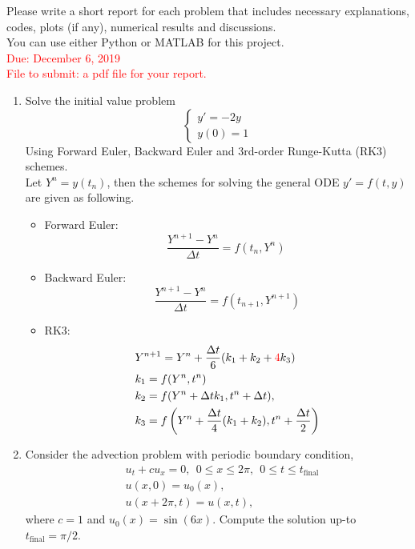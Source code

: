 \documentclass[11pt]{article}
\begin{document}

Please write a short report for each problem that includes necessary  explanations, codes, plots (if any),  numerical results and discussions.\\
You can use either Python or MATLAB for this project.\\
\textcolor{red}{Due: December 6, 2019\\
File to submit: a pdf file for your report.
}

\begin{enumerate}
\item  Solve the initial value problem 
$$
\begin{cases}
y'= -2 y\\
y(0)=1
\end{cases}
$$
Using Forward Euler, Backward Euler and 3rd-order  Runge-Kutta (RK3) schemes.   \\

Let $Y^n=y(t_n)$, then the schemes for solving the general ODE $y'=f(t,y)$ are given as following.
\begin{itemize}
\item Forward Euler:
 $$
 \frac{Y^{n+1}- Y^{n}}{\Delta t } =  f(t_n,Y^n) \
  $$
\item Backward Euler:
 $$
 \frac{Y^{n+1}- Y^{n}}{\Delta t } =  f(t_{n+1},Y^{n+1})
  $$
\item RK3:
\begin{align*}
&Y^{n+1}=Y^n+\frac{\Delta t}{6}(k_1+k_2+\textcolor{red}{4}k_3)\\
&k_1=f(Y^n,t^n)\\
&k_2=f(Y^n+\Delta t k_1,t^n+\Delta t),\\
&k_3=f\left(Y^n+\frac{\Delta t}{4}(k_1+k_2),t^n+\frac{\Delta t}{2}\right)
\end{align*}
\end{itemize}

\item Consider the advection problem with periodic boundary condition, 
\begin{align*}
&u_t+cu_x=0,~~0\leq x\leq 2\pi,~~0\leq t\leq t_{\text{final}}\\
& u(x,0)=u_0(x),\\
& u(x+2\pi,t)=u(x,t),
\end{align*}
where $c=1$ and $u_0(x)=\sin(6x)$. Compute the solution up-to $t_\text{final}=\pi/2$.


\end{enumerate}
\end{document}
